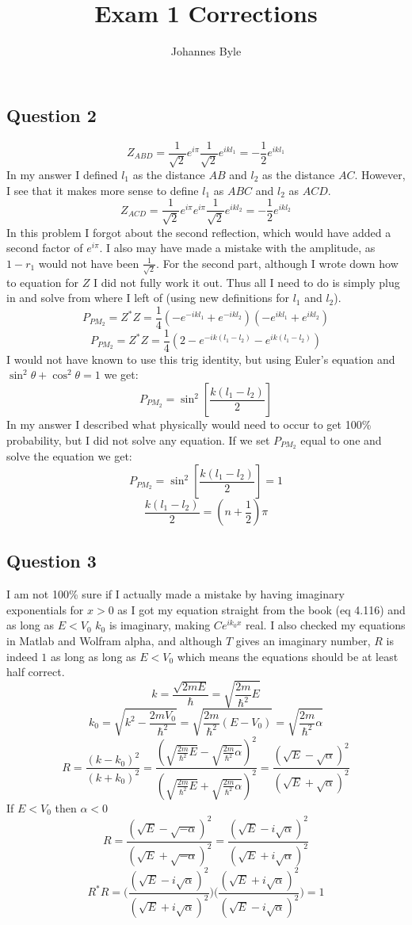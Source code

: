 \documentclass{article}
\begin{document}
\title{Exam 1 Corrections}
\author{Johannes Byle}
\maketitle

\subsection*{Question 2}
$$Z_{ABD}=\frac{1}{\sqrt{2}}e^{i\pi}\frac{1}{\sqrt{2}}e^{ikl_1}=-\frac{1}{2}e^{ikl_1}$$
In my answer I defined $l_1$ as the distance $AB$ and $l_2$ as the distance $AC$. However, I see that it makes more sense to define $l_1$ as $ABC$ and $l_2$ as $ACD$.
$$Z_{ACD}=\frac{1}{\sqrt{2}}e^{i\pi}e^{i\pi}\frac{1}{\sqrt{2}}e^{ikl_2}=-\frac{1}{2}e^{ikl_2}$$
In this problem I forgot about the second reflection, which would have added a second factor of $e^{i\pi}$. I also may have made a mistake with the amplitude, as $1-r_1$ would not have been $\frac{1}{\sqrt{2}}$.
For the second part, although I wrote down how to equation for $Z$ I did not fully work it out. Thus all I need to do is simply plug in and solve from where I left of (using new definitions for $l_1$ and $l_2$).
$$P_{PM_2}=Z^*Z=\frac{1}{4}(-e^{-ikl_1}+e^{-ikl_2})(-e^{ikl_1}+e^{ikl_2})$$
$$P_{PM_2}=Z^*Z=\frac{1}{4}(2-e^{-ik(l_1-l_2)}-e^{ik(l_1-l_2)})$$
I would not have known to use this trig identity, but using Euler's equation and $\sin^2\theta+\cos^2\theta=1$ we get:
$$P_{PM_2}=\sin^2[\frac{k(l_1-l_2)}{2}]$$
In  my answer I described what physically would need to occur to get 100\% probability, but I did not solve any equation. If we set $P_{PM_2}$ equal to one and solve the equation we get:
$$P_{PM_2}=\sin^2[\frac{k(l_1-l_2)}{2}]=1$$
$$\frac{k(l_1-l_2)}{2}=(n+\frac{1}{2})\pi$$

\subsection*{Question 3}
I am not 100\% sure if I actually made a mistake by having imaginary exponentials for $x>0$ as I got my equation straight from the book (eq 4.116) and as long as $E<V_0$ $k_0$ is imaginary, making $Ce^{ik_0x}$ real. I also checked my equations in Matlab and Wolfram alpha, and although $T$ gives an imaginary number, $R$ is indeed $1$ as long as long as $E<V_0$ which means the equations should be at least half correct.\\
$$k=\frac{\sqrt{2mE}}{\hslash}=\sqrt{\frac{2m}{\hslash^2}E}$$
$$k_0=\sqrt{k^2-\frac{2mV_0}{\hslash^2}}=\sqrt{\frac{2m}{\hslash^2}(E-V_0)}=\sqrt{\frac{2m}{\hslash^2}\alpha}$$
$$R=\frac{(k-k_0)^2}{(k+k_0)^2}=\frac{(\sqrt{\frac{2m}{\hslash^2} E}-\sqrt{\frac{2m}{\hslash^2}\alpha})^2}{(\sqrt{\frac{2m}{\hslash^2} E}+\sqrt{\frac{2m}{\hslash^2}\alpha})^2}=\frac{(\sqrt{E}-\sqrt{\alpha})^2}{(\sqrt{E}+\sqrt{\alpha})^2}$$
If $E<V_0$ then $\alpha<0$
$$R=\frac{(\sqrt{E}-\sqrt{-\alpha})^2}{(\sqrt{E}+\sqrt{-\alpha})^2}=\frac{(\sqrt{E}-i\sqrt{\alpha})^2}{(\sqrt{E}+i\sqrt{\alpha})^2}$$
$$R^*R=\Bigg(\frac{(\sqrt{E}-i\sqrt{\alpha})^2}{(\sqrt{E}+i\sqrt{\alpha})^2}\Bigg)\Bigg(\frac{(\sqrt{E}+i\sqrt{\alpha})^2}{(\sqrt{E}-i\sqrt{\alpha})^2}\Bigg)=1$$
\end{document}
